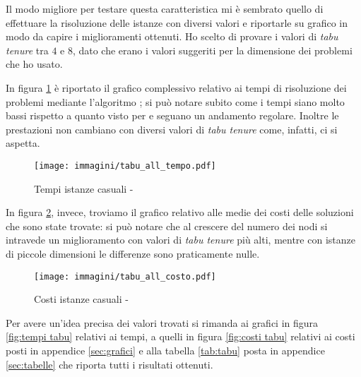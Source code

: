 Il modo migliore per testare questa caratteristica mi è sembrato quello di effettuare la risoluzione delle istanze con diversi valori e riportarle su grafico in modo da capire i miglioramenti ottenuti.
Ho scelto di provare i valori di \emph{tabu tenure} tra $4$ e $8$, dato che erano i valori suggeriti per la dimensione dei problemi che ho usato.

In figura \ref{fig:all tempi tabu} è riportato il grafico complessivo relativo ai tempi di risoluzione dei problemi mediante l'algoritmo \tabu; si può notare subito come i tempi siano molto bassi rispetto a quanto visto per  e seguano un andamento regolare.
Inoltre le prestazioni non cambiano con diversi valori di \emph{tabu tenure} come, infatti, ci si aspetta.

\begin{figure}[htb]
	\centering
	\texttt{[image: immagini/tabu\_all\_tempo.pdf]}
	\caption{Tempi istanze casuali - \tabu}
	\label{fig:all tempi tabu}
\end{figure}


In figura \ref{fig:all costi tabu}, invece, troviamo il grafico relativo alle medie dei costi delle soluzioni che sono state trovate: si può notare che al crescere del numero dei nodi si intravede un miglioramento con valori di \emph{tabu tenure} più alti, mentre con istanze di piccole dimensioni le differenze sono praticamente nulle.

\begin{figure}[htb]
	\centering
	\texttt{[image: immagini/tabu\_all\_costo.pdf]}
	\caption{Costi istanze casuali - \tabu}
	\label{fig:all costi tabu}
\end{figure}

Per avere un'idea precisa dei valori trovati si rimanda ai grafici in figura \ref{fig:tempi tabu} relativi ai tempi, a quelli in figura \ref{fig:costi tabu} relativi ai costi posti in appendice \ref{sec:grafici} e alla tabella \ref{tab:tabu} posta in appendice \ref{sec:tabelle} che riporta tutti i risultati ottenuti.